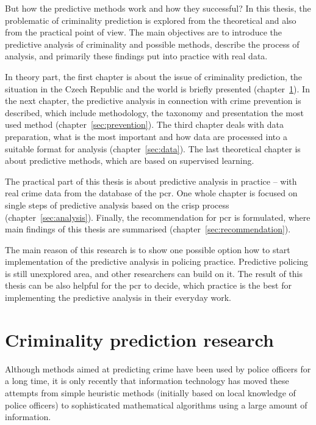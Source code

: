 \documentclass[thesis=M,english]{FITthesis}[2012/10/20]
\begin{document}
\begin{introduction}
But how the predictive methods work and how they successful? In this thesis, the problematic of criminality prediction is explored from the theoretical and also from the practical point of view. The main objectives are to introduce the predictive analysis of criminality and possible methods, describe the process of analysis, and primarily these findings put into practice with real data. 

In theory part, the first chapter is about the issue of criminality prediction, the situation in the Czech Republic and the world is briefly presented (chapter~\ref{sec:theory}). In the next chapter, the predictive analysis in connection with crime prevention is described, which include methodology, the taxonomy and presentation the most used method (chapter~\ref{sec:prevention}). The third chapter deals with data preparation, what is the most important and how data are processed into a suitable format for analysis (chapter~\ref{sec:data}). The last theoretical chapter is about predictive methods, which are based on supervised learning. 

The practical part of this thesis is about predictive analysis in practice -- with real crime data from the database of the \gls{pcr}. One whole chapter is focused on single steps of predictive analysis based on the \gls{crisp} process (chapter~\ref{sec:analysis}). Finally, the recommendation for \gls{pcr} is formulated, where main findings of this thesis are summarised (chapter~\ref{sec:recommendation}).

The main reason of this research is to show one possible option how to start implementation of the predictive analysis in policing practice. Predictive policing is still unexplored area, and other researchers can build on it. The result of this thesis can be also helpful for the \gls{pcr} to decide, which practice is the best for implementing the predictive analysis in their everyday work.

\end{introduction}



\chapter{Criminality prediction research}\label{sec:theory}

Although methods aimed at predicting crime have been used by police officers for a long time, it is only recently that information technology has moved these attempts from simple heuristic methods (initially based on local knowledge of police officers) to sophisticated mathematical algorithms using a large amount of information.\cite[3--4]{PP13}
\end{document}
